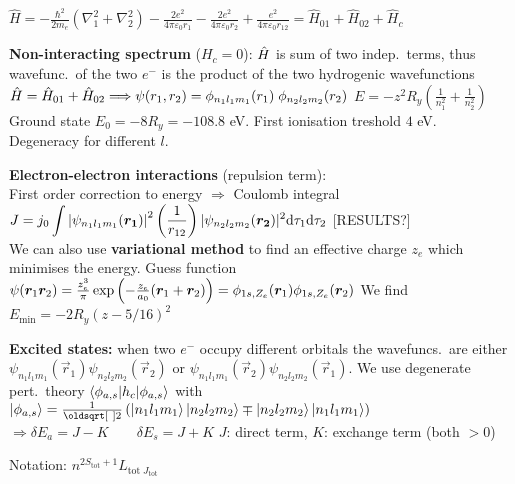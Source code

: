 \begin{squishlist}
    \item $\hat{H} = - \frac{\hbar^2}{2m_e}(\nabla^2_1 + \nabla^2_2) - \frac{2e^2}{4\pi \varepsilon_0 r_1} - \frac{2e^2}{4\pi \varepsilon_0 r_2} + \frac{e^2}{4\pi \varepsilon_0 r_{12}} = \hat{H}_{01} + \hat{H}_{02} + \hat{H}_c$
    \item \textbf{Non-interacting spectrum} ($H_c = 0$): $\hat{H}$ is sum of two indep.\ terms, thus wavefunc.\ of the two $e^-$ is the product of the two hydrogenic wavefunctions \\
    $ \hat{H} = \hat{H}_{01} + \hat{H}_{02} \Longrightarrow \psi(r_1,r_2) = \phi_{n_1 l_1 m_1}(r_1) \; \phi_{n_2 l_2 m_2}(r_2)$ \qquad $E = -z^2 R_y \left( \frac{1}{n_1^2}+ \frac{1}{n_2^2} \right)$ \\
    Ground state $E_0 = -8 R_y = -108.8$ eV. First ionisation treshold $4$ eV. \\
    Degeneracy for different $l$.

    \item \textbf{Electron-electron interactions} (repulsion term): \\
    First order correction to energy $\Rightarrow$ Coulomb integral \\
    $ \displaystyle J = j_0 \int \left|\psi_{n_1 l_1 m_1}(\bm{r_1})\right|^2 \left(\frac{1}{r_{12}}\right) |\psi_{n_2 l_2 m_2}(\bm{r_2})|^2  \textrm{d} \tau_1 \textrm{d} \tau_2$ [RESULTS?] \\
    We can also use \textbf{variational method} to find an effective charge $z_e$ which minimises the energy. Guess function $\psi(\bm{r}_1 \bm{r}_2) = \frac{z_e^3}{\pi}\exp\left(-\frac{z_e}{a_0}(\bm{r}_1 + \bm{r}_2) \right) = \phi_{1s,Z_e}(\bm{r}_1)\phi_{1s,Z_e}(\bm{r}_2)$
    We find $E_{\min} = -2 R_y (z - 5/16)^2$
    \vspace{0.1cm}

    \item \textbf{Excited states:} when two $e^-$ occupy different orbitals the wavefuncs.\ are either
    $\psi_{n_1l_1m_1}(\vec{r}_1) \psi_{n_2l_2m_2}(\vec{r}_2)$ or $\psi_{n_1l_1m_1}(\vec{r}_2) \psi_{n_2l_2m_2}(\vec{r}_1)$. We use degenerate pert.\ theory $\braket{\phi_{a,s}|h_c|\phi_{a,s}}$ with
    $\ket{\phi_{a,s}} = \frac{1}{\sqrt{2}} \left( \ket{n_1l_1m_1}\ket{n_2l_2m_2} \mp \ket{n_2 l_2 m_2}\ket{n_1l_1m_1}\right)$ \\
    $\Rightarrow \delta E_a = J - K \qquad \delta E_s = J + K$ \qquad $J$: direct term, $K$: exchange term (both $> 0$)

    \item Notation: $n^{2S_{\text{tot}}+1} L_{\text{tot}\; J_{\text{tot}}}$
\end{squishlist}

